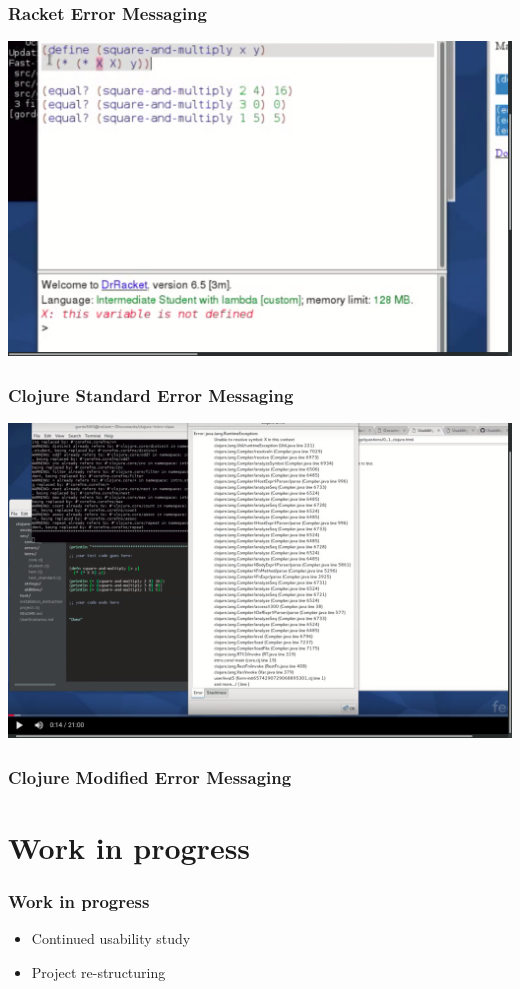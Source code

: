 \documentclass{beamer}
\begin{document}
\begin{frame}
  \frametitle{Racket Error Messaging}
  \includegraphics[scale=.17]{R2Rshot}
\end{frame}

\begin{frame}
  \frametitle{Clojure Standard Error Messaging}
  \includegraphics[scale=.17]{CS20Sshot}
\end{frame}

\begin{frame}
  \frametitle{Clojure Modified Error Messaging}
\end{frame}




\section{Work in progress}

\begin{frame}
  \frametitle{Work in progress}
\begin{itemize}
\item Continued usability study 
\item Project re-structuring
\end{itemize}
\end{frame}
\end{document}
